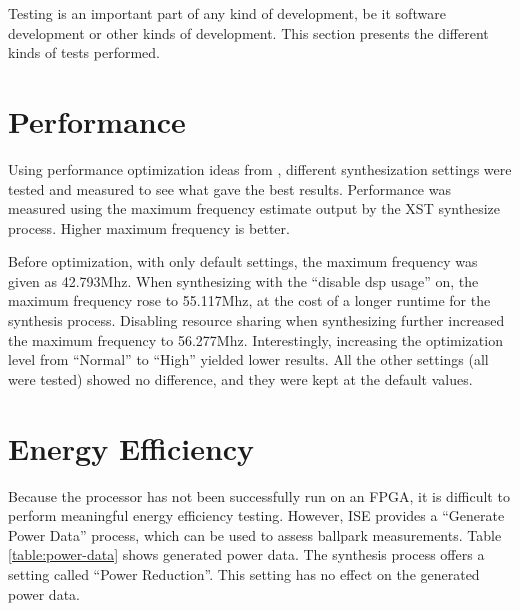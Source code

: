 Testing is an important part of any kind of development, be it software development or other kinds of development.
This section presents the different kinds of tests performed.

\section{Performance}
\label{sec:results-performance}

Using performance optimization ideas from \cite{xilinx-speed-strategies}, different synthesization settings were tested and measured to see what gave the best results.
Performance was measured using the maximum frequency estimate output by the XST synthesize process.
Higher maximum frequency is better.

Before optimization, with only default settings, the maximum frequency was given as 42.793Mhz.
When synthesizing with the ``disable dsp usage'' on, the maximum frequency rose to 55.117Mhz, at the cost of a longer runtime for the synthesis process.
Disabling resource sharing when synthesizing further increased the maximum frequency to 56.277Mhz.
Interestingly, increasing the optimization level from ``Normal'' to ``High'' yielded lower results.
All the other settings (all were tested) showed no difference, and they were kept at the default values.

\section{Energy Efficiency}

Because the processor has not been successfully run on an FPGA, it is difficult to perform meaningful energy efficiency testing.
However, ISE provides a ``Generate Power Data'' process, which can be used to assess ballpark measurements.
Table \vref{table:power-data} shows generated power data.
The synthesis process offers a setting called ``Power Reduction''.
This setting has no effect on the generated power data.

